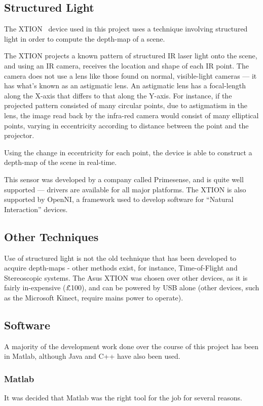 \subsection{Structured Light}
The XTION~\cite{xtion} device used in this project uses a technique involving structured light in order to compute the depth-map of a scene.

The XTION projects a known pattern of structured \ac{IR} laser light onto the scene, and using an \ac{IR} camera, receives the location and shape of each \ac{IR} point. The camera does not use a lens like those found on normal, visible-light cameras --- it has what's known as an astigmatic lens. An astigmatic lens has a focal-length along the X-axis that differs to that along the Y-axis. For instance, if the projected pattern consisted of many circular points, due to astigmatism in the lens, the image read back by the infra-red camera would consist of many elliptical points, varying in eccentricity according to distance between the point and the projector.

Using the change in eccentricity for each point, the device is able to construct a depth-map of the scene in real-time.

This sensor was developed by a company called Primesense, and is quite well supported --- drivers are available for all major platforms. The XTION is also supported by OpenNI, a framework used to develop software for ``Natural Interaction'' devices. 

\subsection{Other Techniques}
Use of structured light is not the old technique that has been developed to acquire depth-maps - other methods exist, for instance, Time-of-Flight and Stereoscopic systems. The Asus XTION was chosen over other devices, as it is fairly in-expensive (\~£100), and can be powered by USB alone (other devices, such as the Microsoft Kinect, require mains power to operate). 

\subsection{Software}
A majority of the development work done over the course of this project has been in Matlab, although Java and C++ have also been used.

\subsubsection{Matlab}
It was decided that Matlab was the right tool for the job for several reasons.

